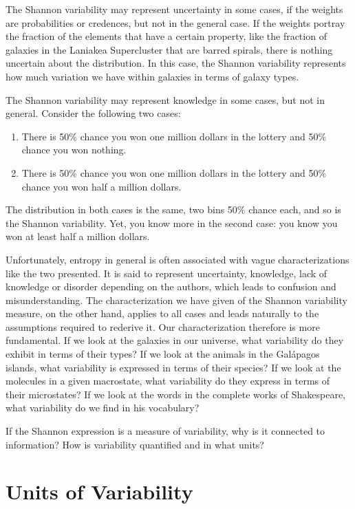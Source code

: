 \documentclass[iopart]{revtex4-1}
\begin{document}
The Shannon variability may represent uncertainty in some cases, if the weights are probabilities or credences, but not in the general case. If the weights portray the fraction of the elements that have a certain property, like the fraction of galaxies in the Laniakea Supercluster that are barred spirals, there is nothing uncertain about the distribution. In this case, the Shannon variability represents how much variation we have within galaxies in terms of galaxy types.

The Shannon variability may represent knowledge in some cases, but not in general. Consider the following two cases:
\begin{enumerate}
\item There is 50\% chance you won one million dollars in the lottery and 50\% chance you won nothing.
\item There is 50\% chance you won one million dollars in the lottery and 50\% chance you won half a million dollars.
\end{enumerate}
The distribution in both cases is the same, two bins 50\% chance each, and so is the Shannon variability. Yet, you know more in the second case: you know you won at least half a million dollars.

Unfortunately, entropy in general is often associated with vague characterizations like the two presented. It is said to represent uncertainty, knowledge, lack of knowledge or disorder depending on the authors, which leads to confusion and misunderstanding.  The characterization we have given of the Shannon variability measure, on the other hand, applies to all cases and leads naturally to the assumptions required to rederive it. Our characterization therefore is more fundamental. If we look at the galaxies in our universe, what variability do they exhibit in terms of their types? If we look at the animals in the Gal\'{a}pagos islands, what variability is expressed in terms of their species? If we look at the molecules in a given macrostate, what variability do they express in terms of their microstates? If we look at the words in the complete works of Shakespeare, what variability do we find in his vocabulary?

If the Shannon expression is a measure of variability, why is it connected to information? How is variability quantified and in what units?

\section{Units of Variability\label{uv}}
\end{document}
